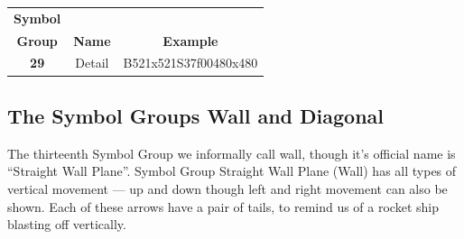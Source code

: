 \documentclass{article}
\begin{document}
\begin{center}
\begin{tabular}{ccc}
\textbf{Symbol}\\
\textbf{Group}&\textbf{Name}&\textbf{Example}\\
\textbf{29}&Detail&B521x521S37f00480x480\\
\end{tabular}
\end{center}

\subsection{The Symbol Groups Wall and Diagonal}

The thirteenth Symbol Group we informally call wall, though it's official name is ``Straight Wall Plane''.
Symbol Group Straight Wall Plane (Wall) has all types of vertical movement --- up and down though left and right movement can also be shown.
Each of these arrows have a pair of tails, to remind us of a rocket ship blasting off vertically.
\end{document}
